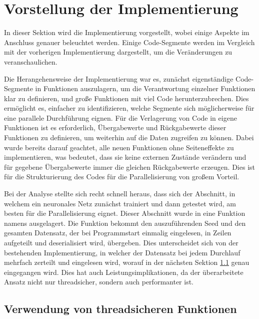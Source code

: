 \section{Vorstellung der Implementierung}
\label{sec:Vorstellung_Implementierung}

In dieser Sektion wird die Implementierung vorgestellt, wobei einige Aspekte im Anschluss genauer beleuchtet werden. Einige Code-Segmente werden im Vergleich mit der vorherigen Implementierung dargestellt, um die Veränderungen zu veranschaulichen.

Die Herangehensweise der Implementierung war es, zunächst eigenständige Code-Segmente in Funktionen auszulagern, um die Verantwortung einzelner Funktionen klar zu definieren, und große Funktionen mit viel Code herunterzubrechen. Dies ermöglicht es, einfacher zu identifizieren, welche Segmente sich möglicherweise für eine parallele Durchführung eignen. Für die Verlagerung von Code in eigene Funktionen ist es erforderlich, Übergabewerte und Rückgabewerte dieser Funktionen zu definieren, um weiterhin auf die Daten zugreifen zu können. Dabei wurde bereits darauf geachtet, alle neuen Funktionen ohne Seiteneffekte zu implementieren, was bedeutet, dass sie keine externen Zustände verändern und für gegebene Übergabewerte immer die gleichen Rückgabewerte erzeugen. Dies ist für die Strukturierung des Codes für die Parallelisierung von großem Vorteil.

Bei der Analyse stellte sich recht schnell heraus, dass sich der Abschnitt, in welchem ein neuronales Netz zunächst trainiert und dann getestet wird, am besten für die Parallelisierung eignet. Dieser Abschnitt wurde in eine Funktion namens \glqq{}\grqq ausgelagert. Die Funktion bekommt den auszuführenden Seed und den gesamten Datensatz, der bei Programmstart einmalig eingelesen, in Zeilen aufgeteilt und deserialisiert wird, übergeben. Dies unterscheidet sich von der bestehenden Implementierung, in welcher der Datensatz bei jedem Durchlauf mehrfach zerteilt und eingelesen wird, worauf in der nächsten Sektion \ref{sec:Verwendung_threadsichere_Funktionen} genau eingegangen wird. Dies hat auch Leistungsimplikationen, da der überarbeitete Ansatz nicht nur threadsicher, sondern auch performanter ist.

\subsection{Verwendung von threadsicheren Funktionen}
\label{sec:Verwendung_threadsichere_Funktionen}

